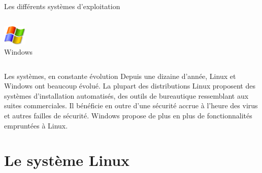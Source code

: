 \begin{frame}{Les différents systèmes d'exploitation}
\begin{columns}
\begin{column}{58mm}
\begin{block}{\center \includegraphics[height=1cm]{img/s01/Windows_logo.png}\\Windows}
\begin{itemize}
        \end{itemize}
        \vrule
      \end{block}
    \end{column}
  \end{columns}
  \begin{alertblock}{Les systèmes, en constante évolution}
    Depuis une dizaine d'année, Linux et Windows ont beaucoup évolué. La
    plupart des distributions Linux proposent des systèmes
    d'installation automatisés, des outils de bureautique ressemblant
    aux suites commerciales. Il bénéficie en outre d'une sécurité accrue
    à l'heure des virus et autres failles de sécurité. Windows propose
    de plus en plus de fonctionnalités empruntées à Linux.
  \end{alertblock}
\end{frame}

\section{Le système Linux}
